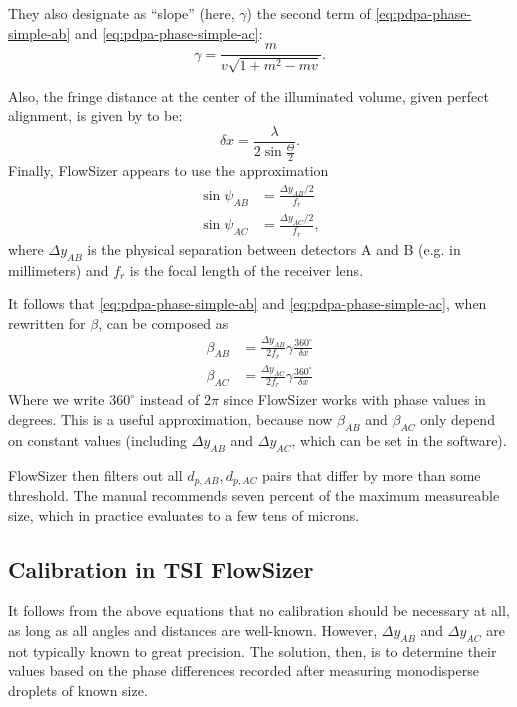 \documentclass[11.5pt,oneside]{book}
\begin{document}
They also designate as ``slope'' (here, $\gamma$) the second term of
\eqref{eq:pdpa-phase-simple-ab} and \eqref{eq:pdpa-phase-simple-ac}:
\begin{equation}
    \gamma = \frac{m}{v \sqrt{1 + m^2 - mv}}.
\end{equation}

Also, the fringe distance at the center of the illuminated volume, given
perfect alignment, is given by \citet{Albrecht03} to be:
\begin{equation}
    \delta x = \frac{\lambda}{2 \sin \frac{\Theta}{2}}.
\end{equation}
Finally, FlowSizer appears to use the approximation 
\begin{align}
    \sin \psi_{AB} &= \frac{\Delta y_{AB}/2}{f_r} \\
    \sin \psi_{AC} &= \frac{\Delta y_{AC}/2}{f_r},
\end{align}
where $\Delta y_{AB}$ is the physical separation between detectors A and B (e.g. in
millimeters) and $f_r$ is the focal length of the receiver lens.

It follows that \eqref{eq:pdpa-phase-simple-ab} and \eqref{eq:pdpa-phase-simple-ac}, when
rewritten for $\beta$, can be composed as
\begin{align}
    \beta_{AB} &= \frac{\Delta y_{AB}}{2f_r} \gamma \frac{360^\circ}{\delta x} \\
    \beta_{AC} &= \frac{\Delta y_{AC}}{2f_r} \gamma \frac{360^\circ}{\delta x}
\end{align}
Where we write $360^\circ$ instead of $2\pi$ since FlowSizer works with phase
values in degrees. This is a useful approximation, because now $\beta_{AB}$ and
$\beta_{AC}$ only depend on constant values (including $\Delta y_{AB}$ and
$\Delta y_{AC}$, which can be set in the software).

FlowSizer then filters out all $d_{p,AB}, d_{p,AC}$ pairs that differ by more than some
threshold. The manual recommends seven percent of the maximum measureable size,
which in practice evaluates to a few tens of microns.

\subsection{Calibration in TSI FlowSizer}
It follows from the above equations that no calibration should be necessary at
all, as long as all angles and distances are well-known. However, $\Delta
y_{AB}$ and $\Delta y_{AC}$ are not typically known to great precision. The
solution, then, is to determine their values based on the phase differences
recorded after measuring monodisperse droplets of known size.
\end{document}
